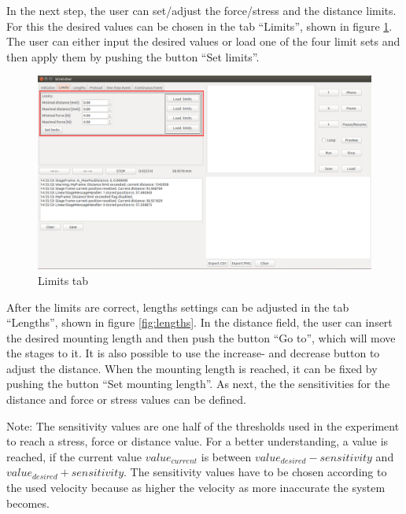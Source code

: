 In the next step, the user can set/adjust the force/stress and the distance limits. For this the desired values can be chosen in the tab ``Limits'', shown in figure \ref{fig:limits}. The user can either input the desired values or load one of the four limit sets and then apply them by pushing the button ``Set limits''.

\begin{figure}[!ht]
	\centering
		\includegraphics[width=1.0\textwidth]{images/Limits}
	\caption{Limits tab}
	\label{fig:limits}
\end{figure}

After the limits are correct, lengths settings can be adjusted in the tab ``Lengths'', shown in figure \ref{fig:lengths}. In the distance field, the user can insert the desired mounting length and then push the button ``Go to'', which will move the stages to it. It is also possible to use the increase- and decrease button to adjust the distance. When the mounting length is reached, it can be fixed by pushing the button ``Set mounting length''. As next, the the sensitivities for the distance and force or stress values can be defined.


\begin{narrowframed}
	Note: The sensitivity values are one half of the thresholds used in the experiment to reach a stress, force or distance value. For a better understanding, a value is reached, if the current value \(value_{current}\) is between \(value_{desired} - sensitivity\) and \(value_{desired} + sensitivity\). The sensitivity values have to be chosen according to the used velocity because as higher the velocity as more inaccurate the system becomes.
\end{narrowframed}

